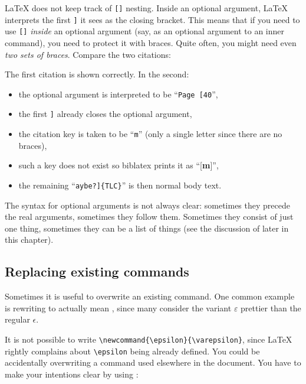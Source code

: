 \begin{gotcha}
\LaTeX{} does not keep track of \verb|[]| nesting.
Inside an optional argument, \LaTeX{} interprets the first \verb|]| it sees as the closing bracket.
This means that if you need to use \verb|[]| \emph{inside} an optional argument
(say, as an optional argument to an inner command), you need to protect it with braces.
Quite often, you might need even \emph{two sets of braces}.
Compare the two citations:
%
\ShowExample
%
The first citation is shown correctly.
In the second:
\begin{itemize}
    \item the optional argument is interpreted to be ``\verb|Page [40|'',
    \item the first \verb|]| already closes the optional argument,
    \item the citation key is taken to be ``\verb|m|''
        (only a single letter since there are no braces),
    \item such a key does not exist so \textsf{biblatex} prints it as ``[\textbf{m}]'',
    \item the remaining ``\verb|aybe?]{TLC}|'' is then normal body text.
\end{itemize}
\end{gotcha}


The syntax for optional arguments is not always clear:
sometimes they precede the real arguments, sometimes they follow them.
Sometimes they consist of just one thing,
sometimes they can be a list of things
(see the discussion of  later in this chapter).


%
\subsection{Replacing existing commands}

Sometimes it is useful to overwrite an existing command.
One common example is rewriting  to actually mean ,
since many consider the variant $\varepsilon$ prettier than the regular $\epsilon$.

It is not possible to write \verb|\newcommand{\epsilon}{\varepsilon}|,
since \LaTeX{} rightly complains about \verb|\epsilon| being already defined.
You could be accidentally overwriting a command used elsewhere in the document.
You have to make your intentions clear by using :


